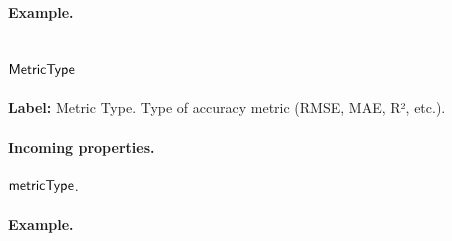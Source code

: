 \paragraph{Example.}

\subsection{$\mathsf{MetricType}$}
\label{sec:term-MetricType}

\textbf{Label:} Metric Type.
Type of accuracy metric (RMSE, MAE, R², etc.).

\paragraph{Incoming properties.} $\mathsf{metricType}$.

\paragraph{Example.}


